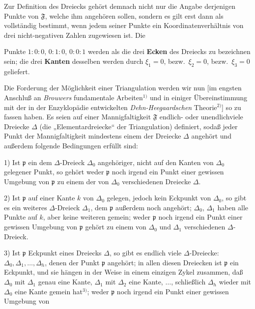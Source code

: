 \documentclass{article}
\begin{document}
Zur Definition des Dreiecks gehört demnach nicht nur die Angabe derjenigen Punkte von $\mathfrak{F}$, welche ihm angehören sollen, sondern es gilt erst dann als vollständig bestimmt, wenn jedem seiner Punkte ein Koordinatenverhältnis von drei nicht-negativen Zahlen zugewiesen ist. Die

Punkte $1:0:0$, $0:1:0$, $0:0:1$ werden als die drei \textbf{Ecken} des Dreiecks zu bezeichnen sein; die drei \textbf{Kanten} desselben werden durch $\xi_1 = 0$, bezw.\ $\xi_2 = 0$, bezw.\ $\xi_3 = 0$ geliefert.

Die Forderung der Möglichkeit einer Triangulation werden wir nun [im engsten Anschluß an \emph{Brouwers} fundamentale Arbeiten${}^{1)}$ und in einiger Übereinstimmung mit der in der Enzyklopädie entwickelten \emph{Dehn-Heegaardschen} Theorie${}^{2)}$] so zu fassen haben. Es seien auf einer Mannigfaltigkeit $\mathfrak{F}$ endlich- oder unendlichviele Dreiecke $\Delta$ (die „Elementardreiecke“ der Triangulation) definiert, sodaß jeder Punkt der Mannigfaltigkeit mindestens einem der Dreiecke $\Delta$ angehört und außerdem folgende Bedingungen erfüllt sind:


1) Ist $\mathfrak{p}$ ein dem $\Delta$-Dreieck $\Delta_0$ angehöriger, nicht auf den Kanten von $\Delta_0$ gelegener Punkt, so gehört weder $\mathfrak{p}$ noch irgend ein Punkt einer gewissen Umgebung von $\mathfrak{p}$ zu einem der von $\Delta_0$ verschiedenen Dreiecke $\Delta$.

2) Ist $\mathfrak{p}$ auf einer Kante $k$ von $\Delta_0$ gelegen, jedoch kein Eckpunkt von $\Delta_0$, so gibt es ein weiteres $\Delta$-Dreieck $\Delta_1$, dem $\mathfrak{p}$ außerdem noch angehört; $\Delta_0$, $\Delta_1$ haben alle Punkte auf $k$, aber keine weiteren gemein; weder $\mathfrak{p}$ noch irgend ein Punkt einer gewissen Umgebung von $\mathfrak{p}$ gehört zu einem von $\Delta_0$ und $\Delta_1$ verschiedenen $\Delta$-Dreieck.

3) Ist $\mathfrak{p}$ Eckpunkt eines Dreiecks $\Delta$, so gibt es endlich viele $\Delta$-Dreiecke: $\Delta_0, \Delta_1, \dots, \Delta_h$, denen der Punkt $\mathfrak{p}$ angehört; in allen diesen Dreiecken ist $\mathfrak{p}$ ein Eckpunkt, und sie hängen in der Weise in einem einzigen Zykel zusammen, daß $\Delta_0$ mit $\Delta_1$ genau eine Kante, $\Delta_1$ mit $\Delta_2$ eine Kante, $\dots$, schließlich $\Delta_h$ wieder mit $\Delta_0$ eine Kante gemein hat${}^{3)}$; weder $\mathfrak{p}$ noch irgend ein Punkt einer gewissen Umgebung von
\end{document}
